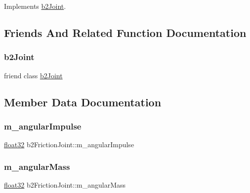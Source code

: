 Implements \mbox{\hyperlink{classb2_joint_ad302c8d02efcfe934158de0dc429348d}{b2\+Joint}}.



\subsection{Friends And Related Function Documentation}
\mbox{\label{classb2_friction_joint_a54ade8ed3d794298108d7f4c4e4793fa}} 
\subsubsection{\texorpdfstring{b2Joint}{b2Joint}}
{\footnotesize\ttfamily friend class \mbox{\hyperlink{classb2_joint}{b2\+Joint}}\hspace{0.3cm}{\ttfamily [friend]}}



\subsection{Member Data Documentation}
\mbox{\label{classb2_friction_joint_ab199dba9687ece4b816589b9e1e14750}} 
\subsubsection{\texorpdfstring{m\_angularImpulse}{m\_angularImpulse}}
{\footnotesize\ttfamily \mbox{\hyperlink{b2_settings_8h_aacdc525d6f7bddb3ae95d5c311bd06a1}{float32}} b2\+Friction\+Joint\+::m\+\_\+angular\+Impulse\hspace{0.3cm}{\ttfamily [protected]}}

\mbox{\label{classb2_friction_joint_ab8f9aa5e516d90f1c80f92b0eb410c38}} 
\subsubsection{\texorpdfstring{m\_angularMass}{m\_angularMass}}
{\footnotesize\ttfamily \mbox{\hyperlink{b2_settings_8h_aacdc525d6f7bddb3ae95d5c311bd06a1}{float32}} b2\+Friction\+Joint\+::m\+\_\+angular\+Mass\hspace{0.3cm}{\ttfamily [protected]}}

